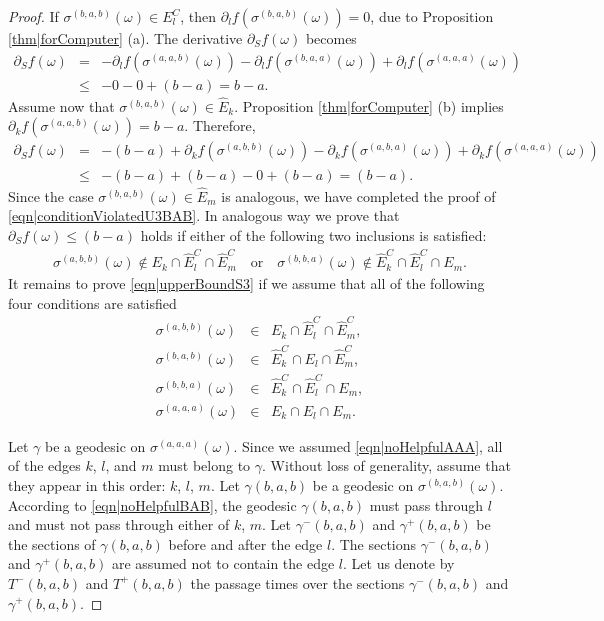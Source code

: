 \documentclass[reqno]{amsart}
\begin{document}
\begin{proof}
If $\sigma^{(b,a,b)}(\omega)\in E_l^C$, then 
$\partial_lf(\sigma^{(b,a,b)}(\omega))=0$,  
due to Proposition 
\ref{thm|forComputer} (a).  The derivative $\partial_Sf(\omega)$ becomes 
\begin{eqnarray*}
\partial_Sf(\omega)&=&-\partial_lf(\sigma^{(a,a,b)}(\omega))-
 \partial_lf(\sigma^{(b,a,a)}(\omega))+\partial_l f(\sigma^{(a,a,a)}(\omega)) \\
&\leq&-0-0+(b-a)=b-a.
\end{eqnarray*}
Assume now that $\sigma^{(b,a,b)}(\omega)\in \hat E_k$. Proposition \ref{thm|forComputer} (b) implies 
$\partial_kf(\sigma^{(a,a,b)}(\omega))=b-a$. Therefore,   
\begin{eqnarray*}\partial_Sf(\omega)&=&-(b-a) + \partial_kf(\sigma^{(a,b,b)}(\omega))-\partial_kf(\sigma^{(a,b,a)}(\omega)) +
\partial_kf(\sigma^{(a,a,a)}(\omega))\\
&\leq&-(b-a)+(b-a)-0+(b-a)=(b-a).
\end{eqnarray*}
Since the case $\sigma^{(b,a,b)}(\omega)\in \hat E_m$ is analogous, we have completed the proof of \eqref{eqn|conditionViolatedU3BAB}.
In analogous way we prove that $\partial_Sf(\omega)\leq (b-a)$ holds if either of the following two inclusions is satisfied:
\begin{eqnarray*} \sigma^{(a,b,b)}(\omega)\not\in E_k\cap \hat E_l^C\cap \hat E_m^C\quad\mbox{or}\quad
 \sigma^{(b,b,a)}(\omega)\not\in \hat E_k^C\cap \hat E_l^C\cap E_m.
\end{eqnarray*}
It remains to prove \eqref{eqn|upperBoundS3} if we assume that all of the following four conditions are satisfied 
\begin{eqnarray}
\sigma^{(a,b,b)}(\omega)&\in& E_k\cap\hat  E_l^C\cap \hat E_m^C,\label{eqn|noHelpfulABB}\\
\sigma^{(b,a,b)}(\omega)&\in& \hat E_k^C\cap E_l\cap \hat E_m^C,\label{eqn|noHelpfulBAB}\\
\sigma^{(b,b,a)}(\omega)&\in& \hat E_k^C\cap\hat  E_l^C\cap E_m,\label{eqn|noHelpfulBBA}\\
\sigma^{(a,a,a)}(\omega) &\in& E_k \cap E_l \cap E_m. 
\label{eqn|noHelpfulAAA}
\end{eqnarray} 

Let $\gamma$ be a geodesic on $\sigma^{(a,a,a)}(\omega)$. Since we assumed \eqref{eqn|noHelpfulAAA}, all of the edges $k$, $l$, and $m$ must belong to $\gamma$. Without loss of generality, assume that they appear in this order: $k$, $l$, $m$. Let $\gamma(b,a,b) $ be a geodesic on $\sigma^{(b,a,b)}(\omega)$. According to \eqref{eqn|noHelpfulBAB}, the geodesic $\gamma(b,a,b)$ must pass through $l$ and must not pass through either of $k$, $m$. Let $\gamma^-(b,a,b)$ and $\gamma^+(b,a,b)$ be the sections of $\gamma(b,a,b)$ before and after the edge $l$. The sections $\gamma^-(b,a,b)$ and $\gamma^+(b,a,b)$ are assumed not to contain the edge $l$. 
Let us denote by $T^-(b,a,b)$ and $T^+(b,a,b)$ the passage times over the sections $\gamma^-(b,a,b)$ and $\gamma^+(b,a,b)$. 



\end{proof}
\end{document}
